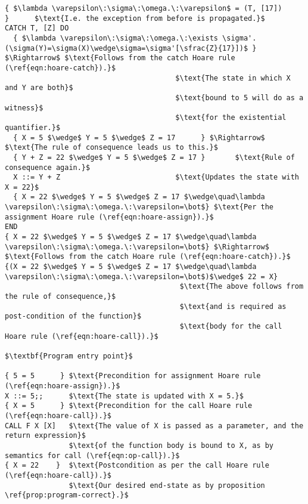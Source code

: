 \begin{lstlisting}[mathescape=true,keepspaces=true,label=lst:hoare_ex_asgn,caption=Decorated variant of the program from listing \ref{lst:imp-plus-ex}.]
  { $\lambda \varepsilon\:\sigma\:\omega.\:\varepsilon$ = (T, [17])          }      $\text{I.e. the exception from before is propagated.}$
CATCH T, [Z] DO
  { $\lambda \varepsilon\:\sigma\:\omega.\:\exists \sigma'.(\sigma(Y)=\sigma(X)\wedge\sigma=\sigma'[\sfrac{Z}{17}])$ } $\Rightarrow$ $\text{Follows from the catch Hoare rule (\ref{eqn:hoare-catch}).}$
                                        $\text{The state in which X and Y are both}$
                                        $\text{bound to 5 will do as a witness}$
                                        $\text{for the existential quantifier.}$
  { X = 5 $\wedge$ Y = 5 $\wedge$ Z = 17      } $\Rightarrow$    $\text{The rule of consequence leads us to this.}$
  { Y + Z = 22 $\wedge$ Y = 5 $\wedge$ Z = 17 }       $\text{Rule of consequence again.}$
  X ::= Y + Z                           $\text{Updates the state with X = 22}$
  { X = 22 $\wedge$ Y = 5 $\wedge$ Z = 17 $\wedge\quad\lambda \varepsilon\:\sigma\:\omega.\:\varepsilon=\bot$} $\text{Per the assignment Hoare rule (\ref{eqn:hoare-assign}).}$
END
{ X = 22 $\wedge$ Y = 5 $\wedge$ Z = 17 $\wedge\quad\lambda \varepsilon\:\sigma\:\omega.\:\varepsilon=\bot$} $\Rightarrow$ $\text{Follows from the catch Hoare rule (\ref{eqn:hoare-catch}).}$
{(X = 22 $\wedge$ Y = 5 $\wedge$ Z = 17 $\wedge\quad\lambda \varepsilon\:\sigma\:\omega.\:\varepsilon=\bot$)$\wedge$ 22 = X}
                                         $\text{The above follows from the rule of consequence,}$
                                         $\text{and is required as post-condition of the function}$
                                         $\text{body for the call Hoare rule (\ref{eqn:hoare-call}).}$

$\textbf{Program entry point}$

{ 5 = 5      } $\text{Precondition for assignment Hoare rule (\ref{eqn:hoare-assign}).}$
X ::= 5;;      $\text{The state is updated with X = 5.}$
{ X = 5      } $\text{Precondition for the call Hoare rule (\ref{eqn:hoare-call}).}$
CALL F X [X]   $\text{The value of X is passed as a parameter, and the return expression}$
               $\text{of the function body is bound to X, as by semantics for call (\ref{eqn:op-call}).}$
{ X = 22    }  $\text{Postcondition as per the call Hoare rule (\ref{eqn:hoare-call}).}$
               $\text{Our desired end-state as by proposition \ref{prop:program-correct}.}$
\end{lstlisting}
